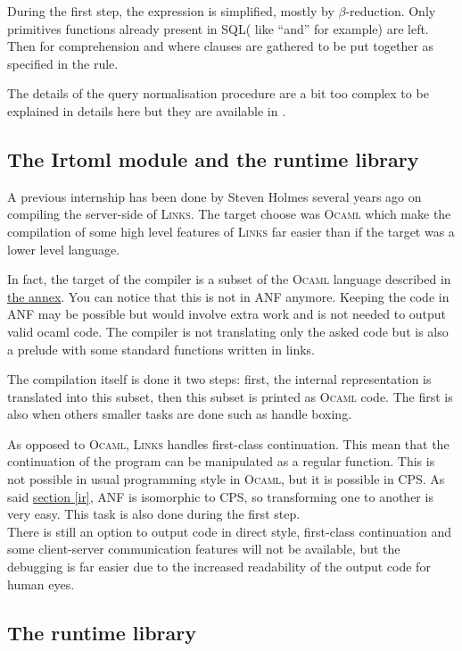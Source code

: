 \documentclass[11pt]{article}
\newcommand\mysc[1]{{\rmfamily\textsc{#1}}\xspace}
\newcommand\links{\mysc{Links}}
\newcommand\sql{\mysc{SQL}}
\newcommand\ocaml{\mysc{Ocaml}}
\newcommand\refsec[1]{\hyperref[#1]{section \ref*{#1}}}
\begin{document}
During the first step, the expression is simplified, mostly by $\beta$-reduction. Only primitives functions already present in \sql ( like ``and'' for example) are left. Then for comprehension and where clauses are gathered to be put together as specified in the  rule.

The details of the query normalisation procedure are a bit too complex to be explained in details here but they are available in \cite{links:querycomp}.

\subsection{The Irtoml module and the runtime library \label{irtoml}}

A previous internship \cite{links:comp} has been done by Steven Holmes several years ago on compiling the server-side of \links. The target choose was \ocaml which make the compilation of some high level features of \links far easier than if the target was a lower level language. 

In fact, the target of the compiler is a subset of the \ocaml language described in \hyperref[ocamlsubset]{the annex}. You can notice that this is not in ANF anymore. Keeping the code in ANF may be possible but would involve extra work and is not needed to output valid ocaml code. The compiler is not translating only the asked code but is also a prelude with some standard functions written in links.

The compilation itself is done it two steps: first, the internal representation is translated into this subset, then this subset is printed as \ocaml code. The first is also when others smaller tasks are done such as handle boxing.

As opposed to \ocaml, \links handles first-class continuation. This mean that the continuation of the program can be manipulated as a regular function. This is not possible in usual programming style in \ocaml, but it is possible in CPS. 
As said \refsec{ir}, ANF is isomorphic to CPS, so transforming one to another is very easy. This task is also done during the first step.\\
There is still an option to output code in direct style, first-class continuation and some client-server communication features will not be available, but the debugging is far easier due to the increased readability of the output code for human eyes.

\subsection{The runtime library\label{runtime}}
\end{document}
